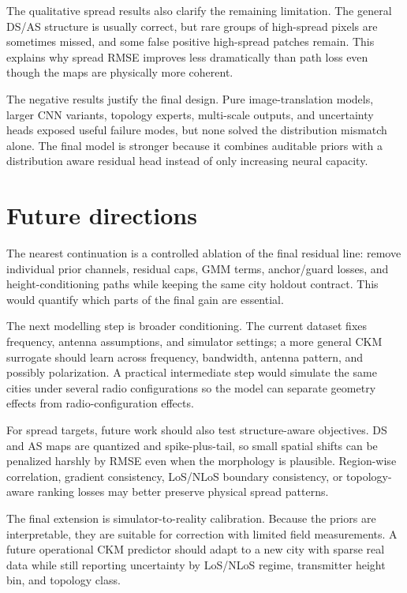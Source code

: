 The qualitative spread results also clarify the remaining limitation. The
general DS/AS structure is usually correct, but rare groups of high-spread
pixels are sometimes missed, and some false positive high-spread patches remain.
This explains why spread RMSE improves less dramatically than path loss even
though the maps are physically more coherent.

The negative results justify the final design. Pure image-translation models,
larger CNN variants, topology experts, multi-scale outputs, and uncertainty
heads exposed useful failure modes, but none solved the distribution mismatch
alone. The final model is stronger because it combines auditable priors with a
distribution aware residual head instead of only increasing neural capacity.

\section{Future directions}

The nearest continuation is a controlled ablation of the final residual line:
remove individual prior channels, residual caps, GMM terms, anchor/guard losses,
and height-conditioning paths while keeping the same city holdout contract.
This would quantify which parts of the final gain are essential.

The next modelling step is broader conditioning. The current dataset fixes
frequency, antenna assumptions, and simulator settings; a more general CKM
surrogate should learn across frequency, bandwidth, antenna pattern, and
possibly polarization. A practical intermediate step would simulate the same
cities under several radio configurations so the model can separate geometry
effects from radio-configuration effects.

For spread targets, future work should also test structure-aware objectives.
DS and AS maps are quantized and spike-plus-tail, so small spatial shifts can be
penalized harshly by RMSE even when the morphology is plausible. Region-wise
correlation, gradient consistency, LoS/NLoS boundary consistency, or
topology-aware ranking losses may better preserve physical spread patterns.

The final extension is simulator-to-reality calibration. Because the priors are
interpretable, they are suitable for correction with limited field measurements.
A future operational CKM predictor should adapt to a new city with sparse real
data while still reporting uncertainty by LoS/NLoS regime, transmitter height bin, and
topology class.
